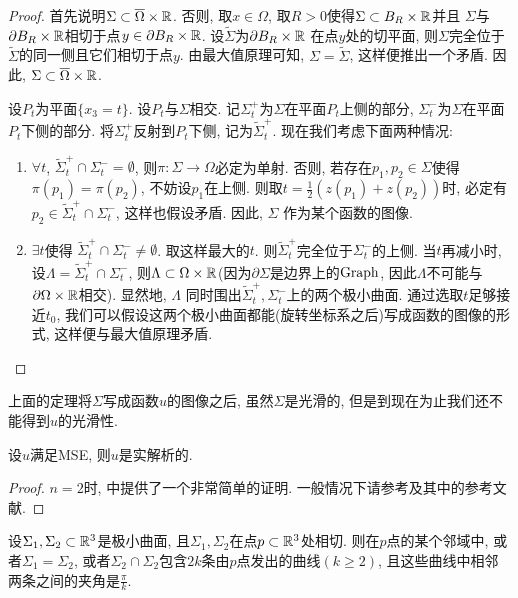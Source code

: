 \begin{proof}
    首先说明$\Sigma \subset \overline{\Omega} \times {\mathbb{R}}$. 否则, 取$x \in \Omega$, 取$R>0$使得$\Sigma \subset B_R\times {\mathbb{R}}$并且 $\Sigma$与$\partial B_R\times {\mathbb{R}}$相切于点$y \in \partial B_R \times {\mathbb{R}}$. 设$\tilde{\Sigma}$为$\partial B_R \times {\mathbb{R}}$ 在点$y$处的切平面, 则$\Sigma$完全位于$\tilde{\Sigma}$的同一侧且它们相切于点$y$. 由最大值原理可知, $\Sigma= \tilde{\Sigma}$, 这样便推出一个矛盾. 因此, $\Sigma \subset \overline{\Omega}\times {\mathbb{R}}$.
    \par 设$P_t$为平面$\{x_3=t\}$. 设$P_t$与$\Sigma$相交. 记$\Sigma_t^+$为$\Sigma$在平面$P_t$上侧的部分, $\Sigma_t^-$为$\Sigma$在平面$P_t$下侧的部分. 将$\Sigma_t^+$反射到$P_t$下侧, 记为$\tilde{\Sigma}_t^+$.  现在我们考虑下面两种情况:
    \begin{enumerate}
        \item  $\forall t$, $\tilde{\Sigma}_t^+\cap \Sigma_t^-=\emptyset$, 则$\pi:\Sigma\to \Omega$必定为单射. 否则, 若存在$p_1,p_2 \in \Sigma$使得 $\pi(p_1)=\pi(p_2)$, 不妨设$p_1$在上侧. 则取$t=\frac{1}{2}(z(p_1)+z(p_2))$时, 必定有$p_2 \in \tilde{\Sigma}_t^+\cap \Sigma_t^-$,  这样也假设矛盾. 因此, $\Sigma$ 作为某个函数的图像.
        \item $\exists t$使得 $\tilde{\Sigma}_t^+ \cap \Sigma_t^-\ne \emptyset$.  取这样最大的$t$. 则$\tilde{\Sigma}_t^+$完全位于$\Sigma_t^-$的上侧.  当$t$再减小时, 设$\Lambda=  \tilde{\Sigma}_t^+ \cap \Sigma_t^-$, 则$\Lambda \subset \Omega \times {\mathbb{R}}$(因为$\partial \Sigma$是边界上的$\text{Graph}$, 因此$\Lambda$不可能与$\partial \Omega \times {\mathbb{R}}$相交). 显然地, $\Lambda$ 同时围出$\tilde{\Sigma}_t^+, \Sigma_t^-$上的两个极小曲面. 通过选取$t$足够接近$t_0$, 我们可以假设这两个极小曲面都能(旋转坐标系之后)写成函数的图像的形式, 这样便与最大值原理矛盾.
    \end{enumerate}
\end{proof}
\begin{remark}
    上面的定理将$\Sigma$写成函数$u$的图像之后, 虽然$\Sigma$是光滑的, 但是到现在为止我们还不能得到$u$的光滑性.
\end{remark}
\begin{theorem}
    设$u$满足MSE, 则$u$是实解析的.
\end{theorem}
\begin{proof}
    $n=2$时, \cite[p.125]{Nit1}中提供了一个非常简单的证明. 一般情况下请参考\cite{Giu84}及其中的参考文献.
\end{proof}
\begin{theorem}
    设$\Sigma_1,\Sigma_2 \subset {\mathbb{R}}^3$是极小曲面, 且$\Sigma_1,\Sigma_2$在点$p\subset {\mathbb{R}}^3$处相切. 则在$p$点的某个邻域中, 或者$\Sigma_1=\Sigma_2$, 或者$\Sigma_2 \cap \Sigma_2$包含$2k$条由$p$点发出的曲线$(k\ge 2)$, 且这些曲线中相邻两条之间的夹角是$\frac{\pi}{k}$.
\end{theorem}
